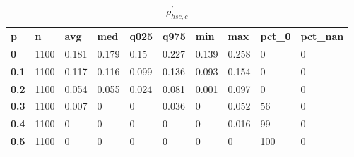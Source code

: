 \begin{table}[h]
 \centering 
\footnotesize
\caption{$\rho_{hsc,c}^\prime $}
\label{tab:alphahscc}
\begin{tabular}[h]{| l l l l l l l l l l|
    } \hline
\textbf{ p} & \textbf{ n} & \textbf{ avg} & \textbf{ med} & \textbf{ q025} & \textbf{ q975} & \textbf{ min} & \textbf{ max} & \textbf{ pct\_0} & \textbf{ pct\_nan}
           \\
  \textbf{  0} & 1100 & 0.181 & 0.179 &  0.15 & 0.227 & 0.139 & 0.258 &   0 & 0
           \\
  \textbf{0.1} & 1100 & 0.117 & 0.116 & 0.099 & 0.136 & 0.093 & 0.154 &   0 & 0
           \\
  \textbf{0.2} & 1100 & 0.054 & 0.055 & 0.024 & 0.081 & 0.001 & 0.097 &   0 & 0
           \\
  \textbf{0.3} & 1100 & 0.007 &     0 &     0 & 0.036 &     0 & 0.052 &  56 & 0
           \\
  \textbf{0.4} & 1100 &     0 &     0 &     0 &     0 &     0 & 0.016 &  99 & 0
           \\
  \textbf{0.5} & 1100 &     0 &     0 &     0 &     0 &     0 &     0 & 100 & 0
           \\
 \hline \end{tabular}
 \end{table}
